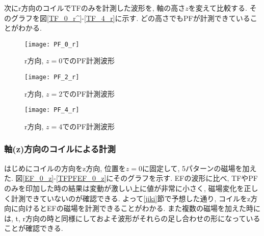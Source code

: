 \documentclass[]{jsarticle}
\begin{document}
次にr方向のコイルでTFのみを計測した波形を, 軸の高さ$z$を変えて比較する. そのグラフを図\ref{TF_0_r^}-\ref{TF_4_r}に示す. どの高さでもPFが計測できていることがわかる. 

	\begin{figure}[htbp]
	
		\begin{minipage}{0.33\hsize}
			\begin{center}
				\texttt{[image: PF\_0\_r]}
				\caption{r方向, $z = 0$でのPF計測波形}
				\label{PF_0_r^}
			\end{center}
		\end{minipage}
		\begin{minipage}{0.33\hsize}
			\begin{center}
				\texttt{[image: PF\_2\_r]}
				\caption{r方向, $z = 2$でのPF計測波形}
				\label{PF_2_r}
			\end{center}
		\end{minipage}
		\begin{minipage}{0.33\hsize}
			\begin{center}
				\texttt{[image: PF\_4\_r]}
				\caption{r方向, $z = 4$でのPF計測波形}
				\label{PF_4_r}
			\end{center}
		\end{minipage}
		
	\end{figure}
	
		
		\subsubsection{軸(z)方向のコイルによる計測}
		
		はじめにコイルの方向をz方向, 位置を$z = 0$に固定して, 5パターンの磁場を加えた. 図\ref{EF_0_z}-\ref{TFPFEF_0_z}にそのグラフを示す. EFの波形に比べ, TFやPFのみを印加した時の結果は変動が激しい上に値が非常に小さく, 磁場変化を正しく計測できていないのが確認できる. よって\ref{jiki}節で予想した通り, コイルをz方向に向けるとEFの磁場を計測できることがわかる. また複数の磁場を加えた時には, t, r方向の時と同様にしておよそ波形がそれらの足し合わせの形になっていることが確認できる. 
		
\end{document}
